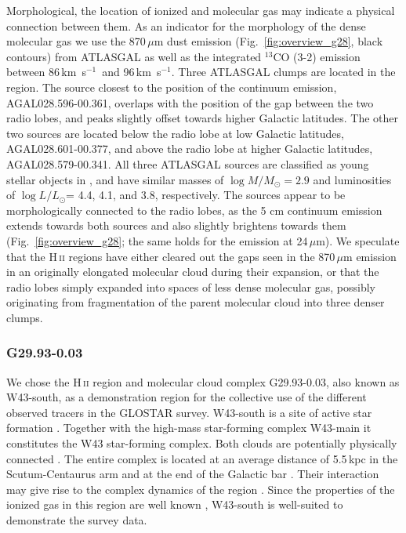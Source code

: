 \documentclass{aa}
\newcommand{\kms}{km~s$^{-1}$}
\DeclareRobustCommand{\ion}[2]{\textup{#1\,\textsc{\lowercase{#2}}}}
\DeclareRobustCommand{\kms}{km\,${\rm s}^{-1}$}
\begin{document}
Morphological, the location of ionized and molecular gas may indicate a physical connection between them. As an indicator for the morphology of the dense molecular gas we use the 870\,$\mu$m dust emission (Fig.~\ref{fig:overview_g28}, black contours) from ATLASGAL \citep{SchullerMenten:2009aa} as well as the integrated ${}^{13}$CO (3-2) emission between 86\,\kms\ and 96\,\kms \citep{RigbyMoore:2016aa}. Three ATLASGAL clumps \citep{ContrerasSchuller:2013aa,UrquhartCsengeriWyrowski2014} are located in the region. The source closest to the position of the continuum emission, AGAL028.596-00.361, overlaps with the position of the gap between the two  radio lobes, and peaks slightly offset towards higher Galactic latitudes. The other two sources are located below the radio lobe at low Galactic latitudes, AGAL028.601-00.377, and above the radio lobe at higher Galactic latitudes, AGAL028.579-00.341. All three ATLASGAL sources are classified as young stellar objects in \citet{UrquhartKonig:2018aa}, and have similar masses of $\log M/M_\odot = 2.9$ and luminosities of $\log L/L_\odot$= 4.4, 4.1, and 3.8, respectively. The sources appear to be morphologically connected to the radio lobes, as the 5 cm continuum emission extends towards both sources and also slightly brightens towards them (Fig.~\ref{fig:overview_g28}; the same holds for the emission at 24\,$\mu$m). We speculate that the \ion{H}{ii} regions have either cleared out the gaps seen in the 870\,$\mu$m emission in an originally elongated molecular cloud during their expansion, or that the radio lobes simply expanded into spaces of less dense molecular gas, possibly originating from fragmentation of the parent molecular cloud into three denser clumps.

\subsubsection{G29.93-0.03}
We chose the \ion{H}{ii} region and molecular cloud complex G29.93-0.03, also known as W43-south, as a demonstration region for the collective use of the different observed tracers in the GLOSTAR survey.  W43-south is a site of active star formation \citep[e.g.,][]{ReifensteinWilson:1970aa,SmithBiermann:1978aa}. Together with the high-mass star-forming complex W43-main it constitutes the W43 star-forming complex. Both clouds are potentially physically connected \citep{Nguyen-LuongMotte:2011aa}. The entire complex is located at an average distance of 5.5\,kpc \citep{ZhangMoscadelli:2014aa} in the Scutum-Centaurus arm and at the end of the Galactic bar \citep{Nguyen-LuongMotte:2011aa,CarlhoffNguyen-Luong:2013aa}. Their interaction may give rise to the complex dynamics of the region \citep[e.g.,][]{Nguyen-LuongMotte:2011aa,Beuther2017}. Since the properties of the ionized gas in this region are well known \citep[e.g.,][]{BeltranOlmi:2013aa}, W43-south is well-suited to demonstrate the survey data.
\end{document}
